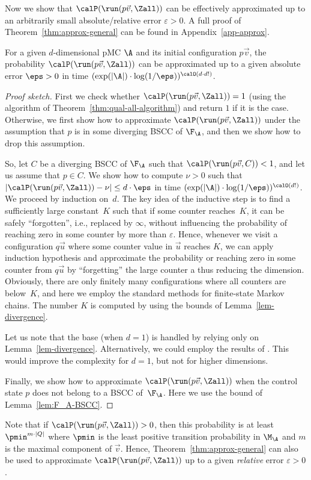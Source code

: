 Now we show that $\calP(\run(p\vec{v},\Zall))$ can be effectively 
approximated up to an arbitrarily small absolute/relative error 
$\varepsilon > 0$. A full proof of Theorem~\ref{thm:approx-general}
can be found in Appendix~\ref{app-approx}.

\begin{theorem}
 \label{thm:approx-general}
 For a given $d$-dimensional pMC $\A$ and its initial configuration
 $p\vec{v}$, the probability $\calP(\run(p\vec{v},\Zall))$ can be
 approximated up to a given absolute error $\eps>0$ in time
 $(\exp(|\A|)\cdot \log(1/\eps))^{\calO(d\cdot d!)}$.
\end{theorem}
\begin{proof}[Proof sketch]
  First we check whether   $\calP(\run(p\vec{v},\Zall))  = 1$ 
  (using the algorithm of Theorem~\ref{thm:qual-all-algorithm}) and 
  return $1$ if it is the case. Otherwise, we first show how
  to approximate $\calP(\run(p\vec{v},\Zall))$ under the 
  assumption that $p$ is in some diverging BSCC of $\F_\A$, and 
  then we show how to drop this assumption.

  So, let $C$ be a diverging BSCC of $\F_\A$ such that 
  $\calP(\run(p\vec{v},C))<1$, and let us assume that $p \in C$. 
  We show how to compute $\nu >0$ such that 
  $|\calP(\run(p\vec{v},\Zall))-\nu|\leq d\cdot\eps$ in time 
  $(\exp(|\A|)\cdot \log(1/\eps))^{\calO(d!)}$. We proceed by induction
  on~$d$. The key idea of the inductive step is to find a sufficiently
  large constant~$K$ such that if some counter reaches~$K$, it can
  be safely ``forgotten'', i.e., replaced by $\infty$, without influencing
  the probability of reaching zero in some counter by more than 
  $\varepsilon$. Hence, whenever we visit a configuration $q\vec{u}$
  where some counter value in $\vec{u}$ reaches $K$, we can
  apply induction hypothesis and approximate the probability or reaching 
  zero in some counter from $q\vec{u}$ by ``forgetting'' the large
  counter a thus reducing the dimension. Obviously, there are only 
  finitely many configurations where all counters are below~$K$, and
  here we employ the standard methods for finite-state Markov chains. 
  The number $K$ is computed by using
  the bounds of Lemma~\ref{lem-divergence}. 

  Let us note that the base (when $d=1$) is handled by relying only
  on Lemma~\ref{lem-divergence}. Alternatively, we could employ
  the results of \cite{ESY:polynomial-time-termination}. This would
  improve the complexity for $d=1$, but not for higher 
  dimensions. 

  Finally, we show how to approximate $\calP(\run(p\vec{v},\Zall))$
  when the control state $p$ does not belong to a BSCC of~$\F_\A$.
  Here we use the bound of Lemma~\ref{lem:F_A-BSCC}.
\end{proof}

Note that if $\calP(\run(p\vec{v},\Zall)) > 0$, then this probability is
at least $\pmin^{m \cdot |Q|}$ where $\pmin$ is the least positive
transition probability in $\M_\A$ and $m$ is the maximal component 
of $\vec{v}$. Hence, Theorem~\ref{thm:approx-general} can also be
used to approximate $\calP(\run(p\vec{v},\Zall))$ up to a given
\emph{relative} error $\varepsilon > 0$.

